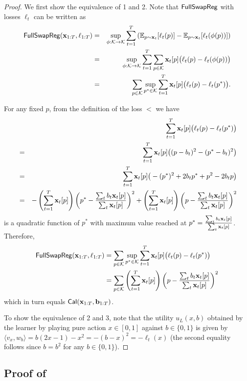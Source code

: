\begin{proof}
We first show the equivalence of 1 and 2. Note that $\mathsf{FullSwapReg}$ with losses $\ell_t$ can be written as 
\begin{eqnarray*}
\mathsf{FullSwapReg}(\mathbf{x}_{1:T},\ell_{1:T}) &=& \sup_{\phi: \mathcal{K} \to \mathcal{K}} \sum_{t=1}^T \left(\mathbb{E}_{p \sim \mathbf{x}_t}[\ell_t(p)] - \mathbb{E}_{p \sim \mathbf{x}_t}[\ell_t(\phi(p))]\right)\\
&=&\sup_{\phi: \mathcal{K} \to \mathcal{K}} \sum_{t=1}^T \sum_{p\in\mathcal{K}}\mathbf{x}_t[p]\big(\ell_t(p)-\ell_t(\phi(p))\big)\\
&=&\sum_{p\in\mathcal{K}}\sup_{p^*\in\mathcal{K}} \sum_{t=1}^T \mathbf{x}_t[p]\big(\ell_t(p)-\ell_t(p^*)\big).
\end{eqnarray*}

For any fixed $p$, from the definition of the loss $\lt$ we have
\begin{eqnarray*}
& &\sum_{t=1}^T \mathbf{x}_t[p]\big(\ell_t(p)-\ell_t(p^*)\big)\\
&=&\sum_{t=1}^T \mathbf{x}_t[p]\big((p-b_t)^2-(p^*-b_t)^2\big)\\
&=&\sum_{t=1}^T \mathbf{x}_t[p]\big(-(p^*)^2+2b_tp^*+p^2-2b_tp\big)\\
&=&-\left(\sum_{t=1}^T \mathbf{x}_t[p]\right)\left(p^*-\frac{\sum_t b_t\mathbf{x}_t[p]}{\sum_t\mathbf{x}_t[p]}\right)^2+\left(\sum_{t=1}^T \mathbf{x}_t[p]\right)\left(p-\frac{\sum_t b_t\mathbf{x}_t[p]}{\sum_t\mathbf{x}_t[p]}\right)^2
\end{eqnarray*}
is a quadratic function of $p^*$ with maximum value reached at $p^*=\frac{\sum_t b_t\mathbf{x}_t[p]}{\sum_t\mathbf{x}_t[p]}$. Therefore, 
\begin{align*}
\mathsf{FullSwapReg}(\mathbf{x}_{1:T},\ell_{1:T}) &= \sum_{p\in\mathcal{K}}\sup_{p^*\in\mathcal{K}} \sum_{t=1}^T \mathbf{x}_t[p]\big(\ell_t(p)-\ell_t(p^*)\big)\\
&= \sum_{p\in\mathcal{K}}\left(\sum_{t=1}^T \mathbf{x}_t[p]\right)\left(p-\frac{\sum_t b_t\mathbf{x}_t[p]}{\sum_t\mathbf{x}_t[p]}\right)^2
\end{align*}
which in turn equals $\operatorname{\mathsf{Cal}}(\mathbf{x}_{1:T}, \mathbf{b}_{1:T})$.

To show the equivalence of 2 and 3, note that the utility $u_L(x, b)$ obtained by the learner by playing pure action $x \in [0, 1]$ against $b \in \{0, 1\}$ is given by $\langle v_x, w_{b}\rangle = b(2x-1) - x^2 = -(b-x)^2 = -\ell_t(x)$ (the second equality follows since $b = b^2$ for any $b \in \{0, 1\}$). 
\end{proof}





\subsection{Proof of }\label{app:calib-bound-proof}




